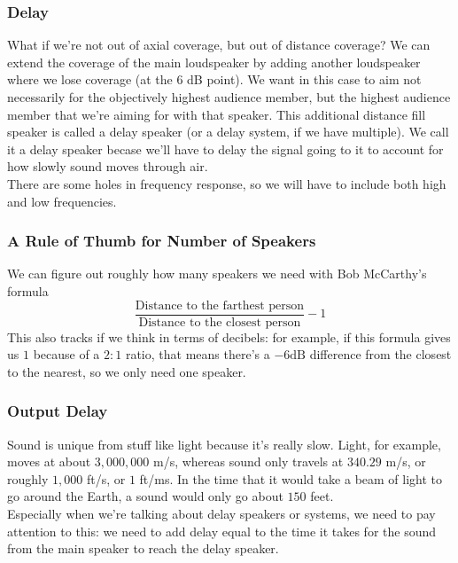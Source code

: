 \documentclass[a4paper]{article}
\begin{document}
\subsubsection{Delay}
What if we're not out of axial coverage, but out of distance coverage? We can
extend the coverage of the main loudspeaker by adding another loudspeaker where
we lose coverage (at the 6 dB point). We want in this case to aim not
necessarily for the objectively highest audience member, but the highest
audience member that we're aiming for with that speaker. This additional
distance fill speaker is called a delay speaker (or a delay system, if we have
multiple). We call it a delay speaker becase we'll have to delay the signal
going to it to account for how slowly sound moves through air.\\
There are some holes in frequency response, so we will have to include both
high %
and low frequencies.

\subsubsection{A Rule of Thumb for Number of Speakers}

We can figure out roughly how many speakers we need with Bob McCarthy's formula
\[
	\frac{\text{Distance to the farthest person}}{\text{Distance to the
	closest person}} - 1
\]
This also tracks if we think in terms of decibels: for example, if this formula
gives us $1$ because of a $2:1$ ratio, that means there's a $-6 \mathrm{dB}$
difference from the closest to the nearest, so we only need one speaker.

\subsubsection{Output Delay}

Sound is unique from stuff like light because it's really slow. Light, for
example, moves at about $3,000,000$ m/s, whereas sound only travels at $340.29$
m/s, or roughly $1,000$ ft/s, or $1$ ft/ms.
In the time that it would take a beam of light to go around the Earth, a
sound would only go about $150$ feet.\\
Especially when we're talking about delay speakers or systems, we need to pay
attention to this: we need to add delay equal to the time it takes for the
sound from the main speaker to reach the delay speaker.
\end{document}
